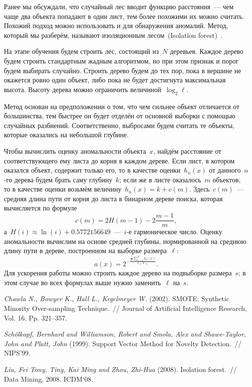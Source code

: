 \documentclass[12pt,fleqn]{article}
\begin{document}
Ранее мы обсуждали, что случайный лес вводит функцию расстояния~--- чем чаще два объекта попадают
в один лист, тем более похожими их можно считать.
Похожий подход можно использовать и для обнаружения аномалий.
Метод, который мы разберём, называют изоляционным лесом~(Isolation forest)~\cite{liu08iforest}.

На этапе обучения будем строить лес, состоящий из~$N$ деревьев.
Каждое дерево будем строить стандартным жадным алгоритмом,
но при этом признак и порог будем выбирать случайно.
Строить дерево будем до тех пор, пока в вершине не окажется ровно один объект,
либо пока не будет достигнута максимальная высота.
Высоту дерева можно ограничить величиной~$\log_2 \ell$.

Метод основан на предположении о том, что чем сильнее объект отличается от большинства,
тем быстрее он будет отделён от основной выборки с помощью случайных разбиений.
Соответственно, выбросами будем считать те объекты, которые оказались на небольшой глубине.

Чтобы вычислить оценку аномальности объекта~$x$, найдём расстояние от соответствующего ему листа
до корня в каждом дереве.
Если лист, в котором оказался объект, содержит только его, то в качестве оценки~$h_n(x)$
от данного~$n$-го дерева будем брать саму глубину~$k$;
если же в листе оказалось~$m$ объектов, то в качестве оценки возьмём величину~$h_n(x) = k + c(m)$.
Здесь~$c(m)$~--- средняя длина пути от корня до листа в бинарном дереве поиска, которая вычисляется по формуле
\[
    c(m)
    =
    2H(m - 1) - 2\frac{m - 1}{m},
\]
а~$H(i) \approx \ln(i) + 0.5772156649$~---~$i$-е гармоническое число.
Оценку аномальности вычислим на основе средней глубины, нормированной на среднюю длину пути в дереве,
построенном на выборке размера~$\ell$:
\[
    a(x)
    =
    2^{-\frac{
            \frac{1}{N} \sum_{n = 1}^{N} h_n(x)
        }{
            c(\ell)
        }
    }.
\]
Для ускорения работы можно строить каждое дерево на подвыборке размера~$s$;
в этом случае во всех формулах выше нужно заменить~$\ell$ на~$s$.


\begin{thebibliography}{1}
    \emph{Chawla N., Bowyer K., Hall L., Kegelmeyer W.} (2002).
    SMOTE: Synthetic Minority Over-sampling Technique.~//
    Journal of Artificial Intelligence Research, Vol. 16, Pp. 321–357.

    \emph{Sch\"{o}lkopf, Bernhard and Williamson, Robert and Smola, Alex and Shawe-Taylor, John and Platt, John} (1999).
    Support Vector Method for Novelty Detection.~//
    NIPS'99.

    \emph{Liu, Fei Tony, Ting, Kai Ming and Zhou, Zhi-Hua} (2008).
    Isolation forest.~//
    Data Mining, 2008. ICDM‘08.
\end{thebibliography}
\end{document}
